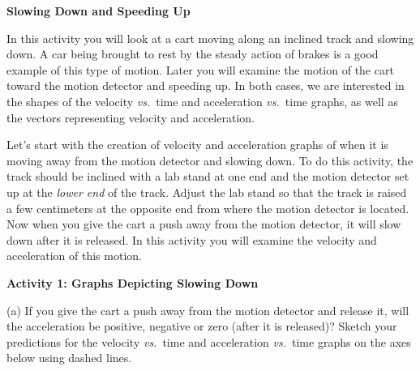\medskip
\textbf{Slowing Down and Speeding Up }

In this activity you will look at a cart moving along an inclined track and
slowing down. A car being brought to rest by the steady action of brakes is
a good example of this type of motion. Later you will examine the motion of
the cart toward the motion detector and speeding up. In both cases, we are interested
in the shapes of the velocity \textit{vs.}~time and acceleration \textit{vs.}~time graphs, as
well as the vectors representing velocity and acceleration. 

Let's start with the creation of velocity and acceleration graphs of when it
is moving away from the motion detector and slowing down. To do this activity,
the track should be inclined with a lab stand at one end and the motion detector set up at the \textit{lower end} of the track. Adjust the lab stand so that the track is raised a few centimeters at the opposite end from where the motion detector is located. Now when you give the cart a push away from the motion detector, it will slow down after it is released. In this activity you will examine the velocity and acceleration of this motion.

\pagebreak[2]
\textbf{Activity 1: Graphs Depicting Slowing Down} 

(a) If you give the cart a push away from the motion detector and release it,
will the acceleration be positive, negative or zero (after it is released)?
Sketch your predictions for the velocity \textit{vs.}~time and acceleration \textit{vs.}~time
graphs on the axes below using dashed lines.

